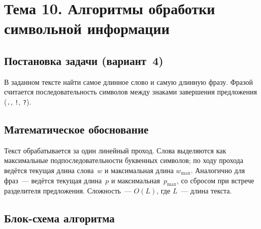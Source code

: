 \section{Тема 10. Алгоритмы обработки символьной информации}

\subsection{Постановка задачи (вариант~4)}

В заданном тексте найти самое длинное слово и самую длинную фразу.
Фразой считается последовательность символов между знаками
завершения предложения (\texttt{.}, \texttt{!}, \texttt{?}).

\subsection{Математическое обоснование}

Текст обрабатывается за один линейный проход. Слова выделяются
как максимальные подпоследовательности буквенных символов;
по ходу прохода ведётся текущая длина слова~$w$ и максимальная
длина $w_{\max}$. Аналогично для фраз~--- ведётся текущая
длина~$p$ и максимальная~$p_{\max}$, со сбросом при встрече
разделителя предложения. Сложность~--- $O(L)$, где $L$~--- длина
текста.

\subsection{Блок-схема алгоритма}

